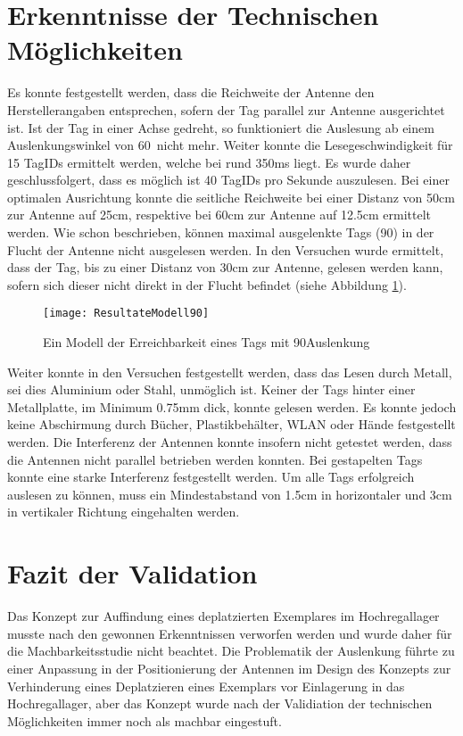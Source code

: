 \section{Erkenntnisse der Technischen Möglichkeiten}
Es konnte festgestellt werden, dass die Reichweite der Antenne den Herstellerangaben entsprechen, sofern der Tag parallel zur Antenne ausgerichtet ist. Ist der Tag in einer Achse gedreht, so funktioniert die Auslesung ab einem Auslenkungswinkel von 60\SIUnitSymbolDegree\ nicht mehr. Weiter konnte die Lesegeschwindigkeit für 15 TagIDs ermittelt werden, welche bei rund 350ms liegt. Es wurde daher geschlussfolgert, dass es möglich ist 40 TagIDs pro Sekunde auszulesen.
Bei einer optimalen Ausrichtung konnte die seitliche Reichweite bei einer Distanz von 50cm zur Antenne auf 25cm, respektive bei 60cm zur Antenne auf 12.5cm ermittelt werden. Wie schon beschrieben, können maximal ausgelenkte Tags (90\SIUnitSymbolDegree) in der Flucht der Antenne nicht ausgelesen werden. In den Versuchen wurde ermittelt, dass der Tag, bis zu einer Distanz von 30cm zur Antenne, gelesen werden kann, sofern sich dieser nicht direkt in der Flucht befindet (siehe Abbildung \ref{fig:Seitlich90}).

\begin{figure}[htb]
	\centering
	\texttt{[image: ResultateModell90]}
	\caption{Ein Modell der Erreichbarkeit eines Tags mit 90\SIUnitSymbolDegree Auslenkung}
	\label{fig:Seitlich90}
\end{figure}

Weiter konnte in den Versuchen festgestellt werden, dass das Lesen durch Metall, sei dies Aluminium oder Stahl, unmöglich ist. Keiner der Tags hinter einer Metallplatte, im Minimum 0.75mm dick, konnte gelesen werden. Es konnte jedoch keine Abschirmung durch Bücher, Plastikbehälter, WLAN oder Hände festgestellt werden. Die Interferenz der Antennen konnte insofern nicht getestet werden, dass die Antennen nicht parallel betrieben werden konnten. Bei gestapelten Tags konnte eine starke Interferenz festgestellt werden. Um alle Tags erfolgreich auslesen zu können, muss ein Mindestabstand von 1.5cm in horizontaler und 3cm in vertikaler Richtung eingehalten werden.

\section{Fazit der Validation}
Das Konzept zur Auffindung eines deplatzierten Exemplares im Hochregallager musste nach den gewonnen Erkenntnissen verworfen werden und wurde daher für die Machbarkeitsstudie nicht beachtet. Die Problematik der Auslenkung führte zu einer Anpassung in der Positionierung der Antennen im Design des Konzepts zur Verhinderung eines Deplatzieren eines Exemplars vor Einlagerung in das Hochregallager, aber das Konzept wurde nach der Validiation der technischen Möglichkeiten immer noch als machbar eingestuft.